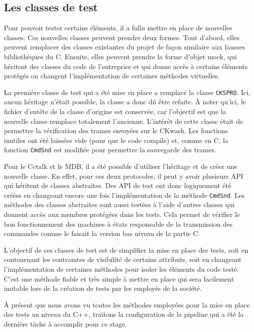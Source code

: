 \documentclass[a4paper]{article}
\begin{document}
\subsection{Les classes de test}%

Pour pouvoir tester certains éléments, il a fallu mettre en place de nouvelles
classes. Ces nouvelles classes peuvent prendre deux formes. Tout d'abord, elles
peuvent remplacer des classes existantes du projet de façon similaire aux
fausses bibliothèques du C. Ensuite, elles peuvent prendre la forme d'objet mock,
qui héritent des classes du code de l'entreprise et qui donne accès à certains
éléments protégés ou changent l'implémentation de certaines méthodes virtuelles.

La première classe de test qui a été mise en place a remplacé la classe
\verb|CKSPRO|. Ici, aucun héritage n'était possible, la classe a donc dû être
refaite. À noter qu'ici, le fichier d'entête de la classe d'origine est
conservée, car l'objectif est que la nouvelle classe remplace totalement
l'ancienne. L'intérêt de cette classe était de permettre la vérification des
trames envoyées sur le CKwash. Les fonctions inutiles ont été laissées vide
(pour que le code compile) et, comme en C, la fonction \verb|CmdSnd| est
modifiée pour permettre la sauvegarde des trames.

Pour le Cctalk et le MDB, il a été possible d'utiliser l'héritage et de créer
une nouvelle classe. En effet, pour ces deux protocoles, il peut y avoir
plusieurs API qui héritent de classes abstraites. Des API de test ont donc
logiquement été créées en changeant encore une fois l'implémentation de la
méthode \verb|CmdSnd|. Les méthodes des classes abstraites sont aussi testées à
l'aide d'autres classes qui donnent accès aux membres protégées dans les tests.
Cela permet de vérifier le bon fonctionnement des machines à états
responsable de la transmission des commandes comme le faisait la version bas
niveau de la partie C.

L'objectif de ces classes de test est de simplifier la mise en place des tests,
soit en contournant les contraintes de visibilité de certains attributs, soit en
changeant l'implémentation de certaines méthodes pour isoler les éléments du
code testé. C'est une méthode fiable et très simple à mettre en place qui sera
facilement imitable lors de la création de tests par les employés de la société.

À présent que nous avons vu toutes les méthodes employées pour la mise en place
des tests au niveau du C++, traitons la configuration de la pipeline qui a été
la dernière tâche à accomplir pour ce stage.
\end{document}
